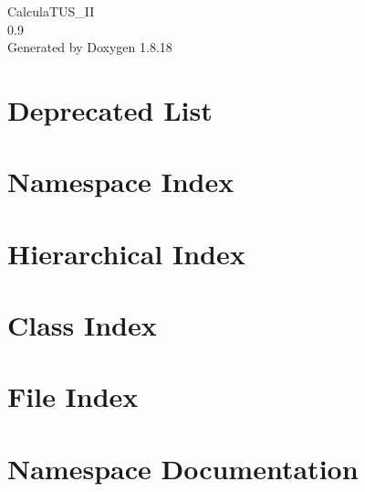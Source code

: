 \let\mypdfximage\pdfximage\def\pdfximage{\immediate\mypdfximage}\documentclass[twoside]{book}
\newcommand{\+}{\discretionary{\mbox{\scriptsize$\hookleftarrow$}}{}{}}
\newcommand{\clearemptydoublepage}{%
  \newpage{\pagestyle{empty}\cleardoublepage}%
}
\begin{document}
\hypersetup{pageanchor=false,
             bookmarksnumbered=true,
             pdfencoding=unicode
            }
\begin{titlepage}
\vspace*{7cm}
\begin{center}%
{\Large Calcula\+T\+U\+S\+\_\+\+II \\[1ex]\large 0.\+9 }\\
\vspace*{1cm}
{\large Generated by Doxygen 1.8.18}\\
\end{center}
\end{titlepage}
\clearemptydoublepage
{}
\tableofcontents
\clearemptydoublepage
{}
\hypersetup{pageanchor=true}

\chapter{Deprecated List}
\label{deprecated}

\chapter{Namespace Index}

\chapter{Hierarchical Index}

\chapter{Class Index}

\chapter{File Index}

\chapter{Namespace Documentation}






\end{document}
